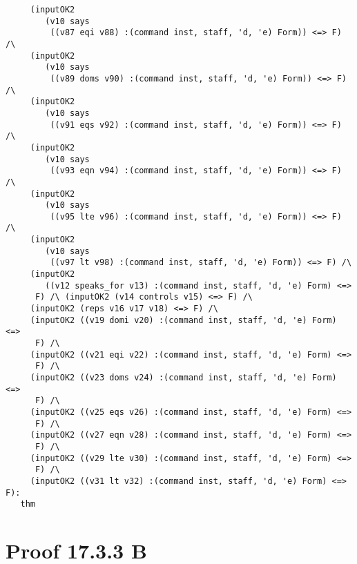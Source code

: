 \documentclass{report}
\begin{document}
\begin{session}
\begin{scriptsize}
\begin{verbatim}
     (inputOK2
        (v10 says
         ((v87 eqi v88) :(command inst, staff, 'd, 'e) Form)) <=> F) /\
     (inputOK2
        (v10 says
         ((v89 doms v90) :(command inst, staff, 'd, 'e) Form)) <=> F) /\
     (inputOK2
        (v10 says
         ((v91 eqs v92) :(command inst, staff, 'd, 'e) Form)) <=> F) /\
     (inputOK2
        (v10 says
         ((v93 eqn v94) :(command inst, staff, 'd, 'e) Form)) <=> F) /\
     (inputOK2
        (v10 says
         ((v95 lte v96) :(command inst, staff, 'd, 'e) Form)) <=> F) /\
     (inputOK2
        (v10 says
         ((v97 lt v98) :(command inst, staff, 'd, 'e) Form)) <=> F) /\
     (inputOK2
        ((v12 speaks_for v13) :(command inst, staff, 'd, 'e) Form) <=>
      F) /\ (inputOK2 (v14 controls v15) <=> F) /\
     (inputOK2 (reps v16 v17 v18) <=> F) /\
     (inputOK2 ((v19 domi v20) :(command inst, staff, 'd, 'e) Form) <=>
      F) /\
     (inputOK2 ((v21 eqi v22) :(command inst, staff, 'd, 'e) Form) <=>
      F) /\
     (inputOK2 ((v23 doms v24) :(command inst, staff, 'd, 'e) Form) <=>
      F) /\
     (inputOK2 ((v25 eqs v26) :(command inst, staff, 'd, 'e) Form) <=>
      F) /\
     (inputOK2 ((v27 eqn v28) :(command inst, staff, 'd, 'e) Form) <=>
      F) /\
     (inputOK2 ((v29 lte v30) :(command inst, staff, 'd, 'e) Form) <=>
      F) /\
     (inputOK2 ((v31 lt v32) :(command inst, staff, 'd, 'e) Form) <=> F):
   thm

\end{verbatim}
  \end{scriptsize}
\end{session}

\section{Proof 17.3.3 B}
\label{proof-6}
\end{document}
